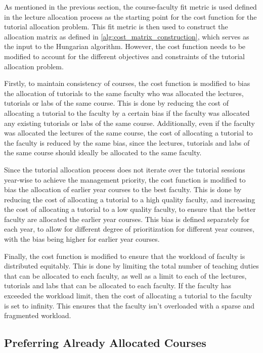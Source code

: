 As mentioned in the previous section, the course-faculty fit metric is used defined in the lecture allocation process as the starting point for the cost function for the tutorial allocation problem. This fit metric is then used to construct the allocation matrix as defined in \autoref{alg:cost_matrix_construction}, which serves as the input to the Hungarian algorithm. However, the cost function needs to be modified to account for the different objectives and constraints of the tutorial allocation problem.

Firstly, to maintain consistency of courses, the cost function is modified to bias the allocation of tutorials to the same faculty who was allocated the lectures, tutorials or labs of the same course. This is done by reducing the cost of allocating a tutorial to the faculty by a certain bias if the faculty was allocated any existing tutorials or labs of the same course. Additionally, even if the faculty was allocated the lectures of the same course, the cost of allocating a tutorial to the faculty is reduced by the same bias, since the lectures, tutorials and labs of the same course should ideally be allocated to the same faculty.

Since the tutorial allocation process does not iterate over the tutorial sessions year-wise to achieve the management priority, the cost function is modified to bias the allocation of earlier year courses to the best faculty. This is done by reducing the cost of allocating a tutorial to a high quality faculty, and increasing the cost of allocating a tutorial to a low quality faculty, to ensure that the better faculty are allocated the earlier year courses. This bias is defined separately for each year, to allow for different degree of prioritization for different year courses, with the bias being higher for earlier year courses.

Finally, the cost function is modified to ensure that the workload of faculty is distributed equitably. This is done by limiting the total number of teaching duties that can be allocated to each faculty, as well as a limit to each of the lectures, tutorials and labs that can be allocated to each faculty. If the faculty has exceeded the workload limit, then the cost of allocating a tutorial to the faculty is set to infinity. This ensures that the faculty isn't overloaded with a sparse and fragmented workload.

\subsection{Preferring Already Allocated Courses}

